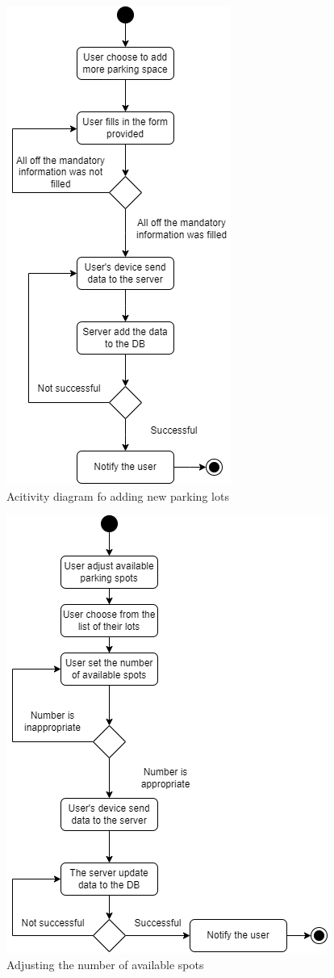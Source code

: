 \begin{figure}[H]
    \centering
    \includegraphics[width=0.5\linewidth]{assets/images/Implementation/Parking/Add parking activity.drawio.png}
    \caption{Acitivity diagram fo adding new parking lots}
    \label{fig:parking_add}
\end{figure}

\begin{figure}[H]
    \centering
    \includegraphics[width=0.7\linewidth]{assets/images/Implementation/Parking/Adjusting available activity.drawio.png}
    \caption{Adjusting the number of available spots}
    \label{fig:parking_adjust}
\end{figure}


